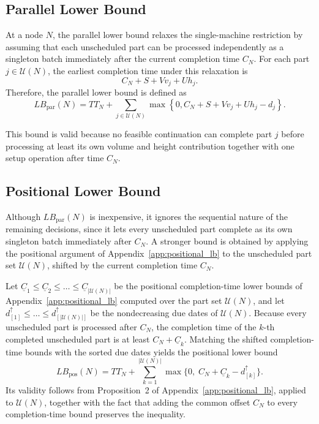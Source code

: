 \documentclass[review,3p,times,authoryear]{elsarticle}
\begin{document}
\subsection{Parallel Lower Bound}

At a node $N$, the parallel lower bound relaxes the single-machine
restriction by assuming that each unscheduled part can be processed
independently as a singleton batch immediately after the current completion
time $C_N$. For each part $j\in\mathcal{U}(N)$, the earliest completion time
under this relaxation is
\begin{equation}
	C_N+S+Vv_j+Uh_j .
\end{equation}
Therefore, the parallel lower bound is defined as
\begin{equation}
	LB_{\mathrm{par}}(N)
	=
	TT_N
	+
	\sum_{j\in\mathcal{U}(N)}
	\max
	\left\{
	0,
	C_N+S+Vv_j+Uh_j-d_j
	\right\}.
	\label{eq:oracle_lb_par}
\end{equation}

This bound is valid because no feasible continuation can complete part $j$
before processing at least its own volume and height contribution together
with one setup operation after time $C_N$.

\subsection{Positional Lower Bound}

Although $LB_{\mathrm{par}}(N)$ is inexpensive, it ignores the sequential
nature of the remaining decisions, since it lets every unscheduled part
complete as its own singleton batch immediately after $C_N$. A stronger bound
is obtained by applying the positional argument of
Appendix~\ref{app:positional_lb} to the unscheduled part set
$\mathcal{U}(N)$, shifted by the current completion time $C_N$.

Let
$\underline{C}_1\le\underline{C}_2\le\dots\le\underline{C}_{|\mathcal{U}(N)|}$
be the positional completion-time lower bounds of
Appendix~\ref{app:positional_lb} computed over the part set $\mathcal{U}(N)$,
and let
$d^{\uparrow}_{[1]}\le\dots\le d^{\uparrow}_{[|\mathcal{U}(N)|]}$ be the
nondecreasing due dates of $\mathcal{U}(N)$. Because every unscheduled part is
processed after $C_N$, the completion time of the $k$-th completed unscheduled
part is at least $C_N+\underline{C}_k$. Matching the shifted completion-time
bounds with the sorted due dates yields the positional lower bound
\begin{equation}
	LB_{\mathrm{pos}}(N)
	=
	TT_N
	+
	\sum_{k=1}^{|\mathcal{U}(N)|}
	\max\bigl\{0,\;C_N+\underline{C}_k-d^{\uparrow}_{[k]}\bigr\}.
	\label{eq:oracle_lb_pos}
\end{equation}
Its validity follows from Proposition~2 of Appendix~\ref{app:positional_lb},
applied to $\mathcal{U}(N)$, together with the fact that adding the common
offset $C_N$ to every completion-time bound preserves the inequality.
\end{document}
